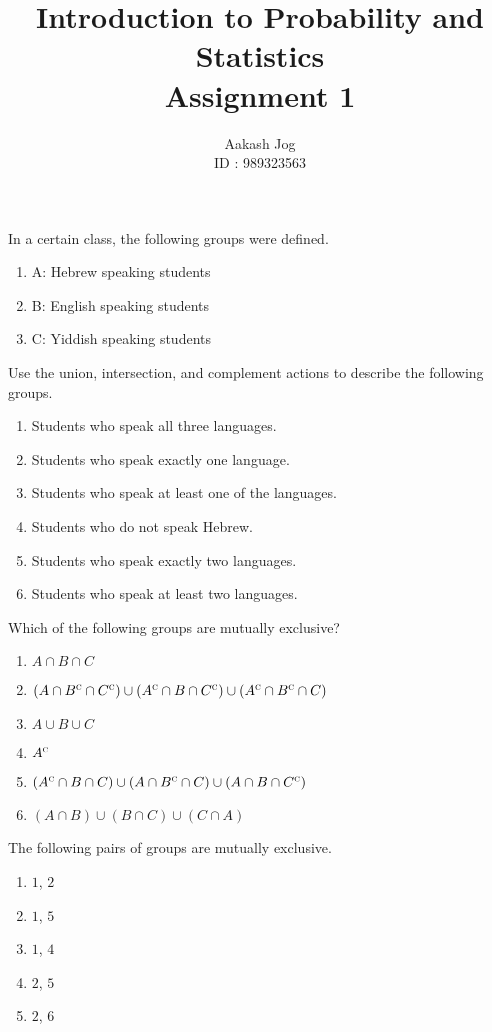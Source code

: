 \documentclass[fleqn, a4paper, 11pt, oneside]{amsart}
\title
[
	Introduction to Probability and Statistics : Assignment 1
]
{
	Introduction to Probability and Statistics\\
	Assignment 1
}
\author
{
	Aakash Jog\\
	ID : 989323563
}
\date{\formatdate{9}{3}{2016}}
\theoremstyle{definition}
\theoremstyle{theorem}
\DeclareMathOperator{\comp}{\textsc{c}}
\begin{document}
\maketitle

\begin{question}
	In a certain class, the following groups were defined.
	\begin{enumerate}
		\item A: Hebrew speaking students
		\item B: English speaking students
		\item C: Yiddish speaking students
	\end{enumerate}
	Use the union, intersection, and complement actions to describe the following groups.
	\begin{enumerate}
		\item Students who speak all three languages.
		\item Students who speak exactly one language.
		\item Students who speak at least one of the languages.
		\item Students who do not speak Hebrew.
		\item Students who speak exactly two languages.
		\item Students who speak at least two languages.
	\end{enumerate}
	Which of the following groups are mutually exclusive?
\end{question}

\begin{solution}
	\begin{enumerate}
		\item $A \cap B \cap C$
		\item $\left( A \cap B^{\comp} \cap C^{\comp} \right) \cup \left( A^{\comp} \cap B \cap C^{\comp} \right) \cup \left( A^{\comp} \cap B^{\comp} \cap C \right)$
		\item $A \cup B \cup C$
		\item $A^{\comp}$
		\item $\left( A^{\comp} \cap B \cap C \right) \cup \left( A \cap B^{\comp} \cap C \right) \cup \left( A \cap B \cap C^{\comp} \right)$
		\item $(A \cap B) \cup (B \cap C) \cup (C \cap A)$
	\end{enumerate}
	The following pairs of groups are mutually exclusive.
	\begin{enumerate}
		\item $1$, $2$
		\item $1$, $5$
		\item $1$, $4$
		\item $2$, $5$
		\item $2$, $6$
	\end{enumerate}
\end{solution}
\end{document}
